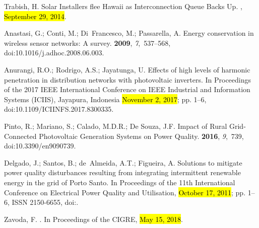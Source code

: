 \documentclass[energies,article,accept,moreauthors,pdftex]{Definitions/mdpi}
\begin{document}
\begin{thebibliography}{999}
\providecommand{\natexlab}[1]{#1}

Trabish, H.
\newblock Solar Installers flee {Hawaii} as Interconnection Queue Backs Up.
, {\hl{September 29, 2014}}.%

Anastasi, G.; Conti, M.; Di~Francesco, M.; Passarella, A.
\newblock Energy conservation in wireless sensor networks: {A} survey.
 {\bf 2009}, {\em 7},~537--568, doi:10.1016/j.adhoc.2008.06.003.

Anurangi, R.O.; Rodrigo, A.S.; Jayatunga, U.
\newblock Effects of high levels of harmonic penetration in distribution
networks with photovoltaic inverters.
\newblock In {Proceedings of the } 2017 {IEEE} {International} {Conference} on IEEE Industrial and {Information} {Systems} ({ICIIS}), Jayapura, Indonesia \hl{November 2, 2017}; pp. 1--6, doi:10.1109/ICIINFS.2017.8300335.%

Pinto, R.; Mariano, S.; Calado, M.D.R.;  De Souza, J.F.
\newblock Impact of {Rural} {Grid}-{Connected} {Photovoltaic} {Generation}
{Systems} on {Power} {Quality}.
 {\bf 2016}, {\em 9},~739, doi:10.3390/en9090739.

Delgado, J.; Santos, B.; de~Almeida, A.T.; Figueira, A.
\newblock Solutions to mitigate power quality disturbances resulting from
integrating intermittent renewable energy in the grid of {Porto} {Santo}.
\newblock In {Proceedings of the } 11th {International} {Conference} on {Electrical} {Power} {Quality}
and {Utilisation}, \hl{October 17, 2011}; pp. 1--6,
\newblock ISSN 2150-6655,
doi:{\href{https://doi.org/10.1109/EPQU.2011.6128870}{}}.

Zavoda, F.
. In {Proceedings of the } CIGRE, \hl{May 15, 2018}.


\end{thebibliography}
\end{document}
